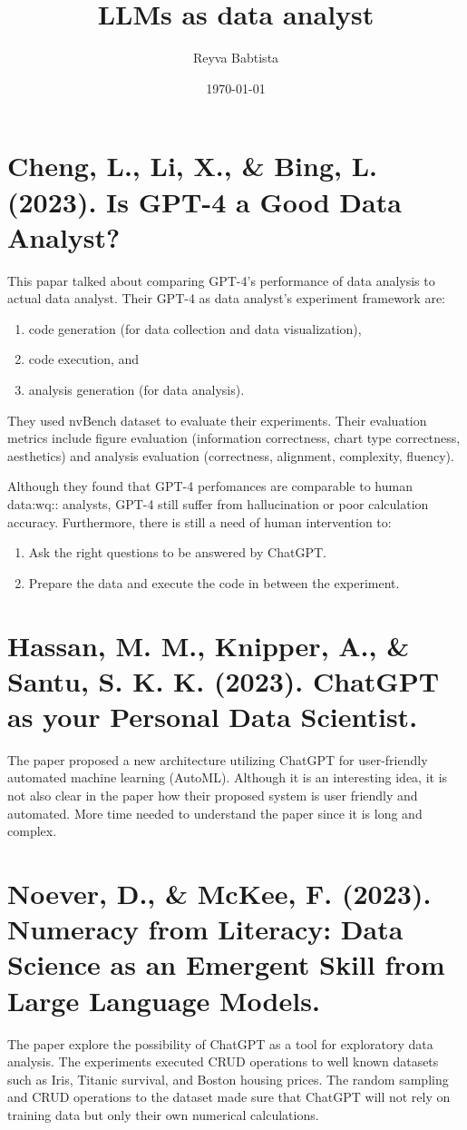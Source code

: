 \documentclass[11pt]{article}
\author{Reyva Babtista}
\date{\today}
\title{LLMs as data analyst}
\begin{document}
\maketitle

\section{Cheng, L., Li, X., \& Bing, L. (2023). Is GPT-4 a Good Data Analyst?}
\label{sec:org23ef5f9}
This papar talked about comparing GPT-4's
performance of data analysis to actual data analyst. Their GPT-4 as data
analyst's experiment framework are:
\begin{enumerate}
\item code generation (for data collection and data visualization),
\item code execution, and
\item analysis generation (for data analysis).
\end{enumerate}
They used nvBench dataset to evaluate their experiments. Their evaluation
metrics include figure evaluation (information correctness, chart type
correctness, aesthetics) and analysis evaluation (correctness, alignment,
complexity, fluency).

Although they found that GPT-4 perfomances are comparable to human data:wq::
analysts, GPT-4 still suffer from hallucination or poor calculation accuracy.
Furthermore, there is still a need of human intervention to:
\begin{enumerate}
\item Ask the right questions to be answered by ChatGPT.
\item Prepare the data and execute the code in between the experiment.
\end{enumerate}

\section{Hassan, M. M., Knipper, A., \& Santu, S. K. K. (2023). ChatGPT as your Personal Data Scientist.}
\label{sec:orgbd35f9f}
The paper proposed a new architecture utilizing ChatGPT for user-friendly
automated machine learning (AutoML). Although it is an interesting idea, it is
not also clear in the paper how their proposed system is user friendly and
automated. More time needed to understand the paper since it is long and
complex.

\section{Noever, D., \& McKee, F. (2023). Numeracy from Literacy: Data Science as an Emergent Skill from Large Language Models.}
\label{sec:orgd26ac11}
The paper explore the possibility of ChatGPT as a tool for exploratory data
analysis. The experiments executed CRUD operations to well known datasets such
as Iris, Titanic survival, and Boston housing prices. The random sampling and
CRUD operations to the dataset made sure that ChatGPT will not rely on training
data but only their own numerical calculations.
\end{document}
